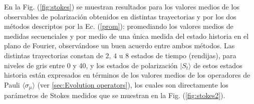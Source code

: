  En la Fig. (\ref{fig:stokes}) se muestran resultados para los valores medios de los observables de polarización obtenidos en distintas trayectorias y por los dos métodos descriptos por la Ec. (\ref{prom}):  promediando los valores medios de medidas secuenciales y por medio de una única medida del estado historia en el plano de Fourier, observándose un buen acuerdo entre ambos métodos. Las distintas trayectorias constan de $2$, $4$ u $8$ estados de tiempo (rendijas), para niveles de gris entre 0 y 40, y los estados de polarización $|S_t\rangle$ de estos estados historia  están expresados en términos de los valores medios de los operadores de Pauli
 $\langle\sigma_\mu\rangle$ (ver \ref{sec:Evolution operators}), los cuales son directamente los parámetros de Stokes medidos que se muestran en la Fig. (\ref{fig:stokes2}).
 

